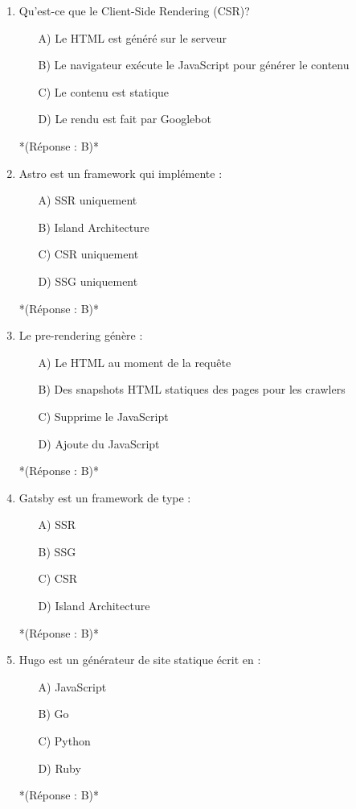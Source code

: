 \documentclass[12pt,a4paper,twoside]{report}
\begin{document}
\begin{enumerate}
\item Qu'est-ce que le Client-Side Rendering (CSR)?
\begin{itemize}
\item[A)] Le HTML est généré sur le serveur
\item[B)] Le navigateur exécute le JavaScript pour générer le contenu
\item[C)] Le contenu est statique
\item[D)] Le rendu est fait par Googlebot
\end{itemize}
*(Réponse : B)*

\item Astro est un framework qui implémente :
\begin{itemize}
\item[A)] SSR uniquement
\item[B)] Island Architecture
\item[C)] CSR uniquement
\item[D)] SSG uniquement
\end{itemize}
*(Réponse : B)*

\item Le pre-rendering génère :
\begin{itemize}
\item[A)] Le HTML au moment de la requête
\item[B)] Des snapshots HTML statiques des pages pour les crawlers
\item[C)] Supprime le JavaScript
\item[D)] Ajoute du JavaScript
\end{itemize}
*(Réponse : B)*

\item Gatsby est un framework de type :
\begin{itemize}
\item[A)] SSR
\item[B)] SSG
\item[C)] CSR
\item[D)] Island Architecture
\end{itemize}
*(Réponse : B)*

\item Hugo est un générateur de site statique écrit en :
\begin{itemize}
\item[A)] JavaScript
\item[B)] Go
\item[C)] Python
\item[D)] Ruby
\end{itemize}
*(Réponse : B)*


\end{enumerate}
\end{document}
